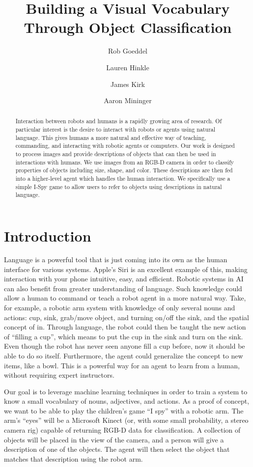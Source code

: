 \documentclass[11pt]{article}
\title{Building a Visual Vocabulary Through Object Classification}
\author{Rob Goeddel \and Lauren Hinkle \and James Kirk \and Aaron Mininger}
\date{}
\newcommand{\xxx}[1]{{\bf \color{red} #1}}
\begin{document}
\maketitle



\begin{abstract}
Interaction between robots and humans is a rapidly growing area of research.
Of particular interest is the desire to interact with robots or agents using
natural language. This gives humans a more natural and effective way of teaching,
commanding, and interacting with robotic agents or computers. Our work is
designed to process images and provide descriptions of objects that can then be
used in interactions with humans. We use images from an RGB-D camera in order to
classify properties of objects including size, shape, and color. These
descriptions are then fed into a higher-level agent which handles the human
interaction. We specifically use a simple I-Spy game to allow users to refer to
objects using descriptions in natural language.
\end{abstract}


\section{Introduction}
Language is a powerful tool that is just coming into its own as the human
interface for various systems. Apple's Siri is an excellent example of this,
making interaction with your phone intuitive, easy, and efficient. Robotic
systems in AI can also benefit from greater understanding of language. Such
knowledge could allow a human to command or teach a robot agent in a more natural
way. Take, for example, a robotic arm system with knowledge of only several nouns
and actions: cup, sink, grab/move object, and turning on/off the sink, and the
spatial concept of in. Through language, the robot could then be taught the new
action of ``filling a cup'', which means to put the cup in the sink and turn on
the sink. Even though the robot has never seen anyone fill a cup before, now it
should be able to do so itself. Furthermore, the agent could generalize the
concept to new items, like a bowl. This is a powerful way for an agent to learn
from a human, without requiring expert instructors.

Our goal is to leverage machine learning techniques in order to train a system
to know a small vocabulary of nouns, adjectives, and actions. As a proof of
concept, we want to be able to play the children's game ``I spy'' with a robotic
arm. The arm's ``eyes'' will be a Microsoft Kinect (or, with some small
probability, a stereo camera rig) capable of returning RGB-D data for
classification. A collection of objects will be placed in the view of the camera,
and a person will give a description of one of the objects. The agent will then
select the object that matches that description using the robot arm.
\end{document}
